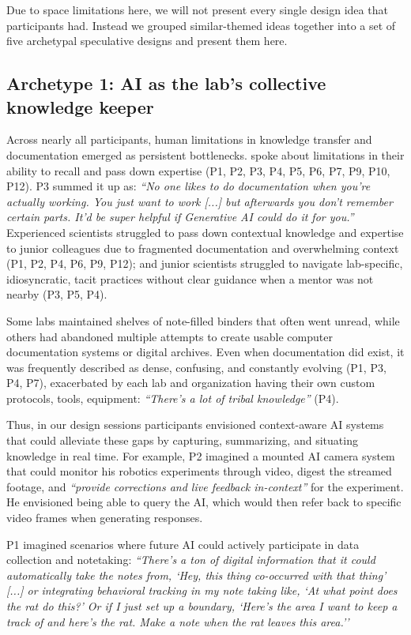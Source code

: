 Due to space limitations here, we will not present every single design idea that participants had. Instead we grouped similar-themed ideas together into a set of five archetypal speculative designs and present them here.


\subsection{\textbf{Archetype 1: AI as the lab's collective knowledge keeper}} Across nearly all participants, human limitations in knowledge transfer and documentation emerged as persistent bottlenecks.  spoke about limitations in their ability to recall and pass down expertise (P1, P2, P3, P4, P5, P6, P7, P9, P10, P12). P3 summed it up as: \textit{``No one likes to do documentation when you're actually working. You just want to work [...] but afterwards you don't remember certain parts. It'd be super helpful if Generative AI could do it for you.''} Experienced scientists struggled to pass down contextual knowledge and expertise to junior colleagues due to fragmented documentation and overwhelming context (P1, P2, P4, P6, P9, P12); and junior scientists struggled to navigate lab-specific, idiosyncratic, tacit practices without clear guidance when a mentor was not nearby (P3, P5, P4).

Some labs maintained shelves of note-filled binders that often went unread, while others had abandoned multiple attempts to create usable computer documentation systems or digital archives. Even when documentation did exist, it was frequently described as dense, confusing, and constantly evolving (P1, P3, P4, P7), exacerbated by each lab and organization having their own custom protocols, tools, equipment: \emph{``There's a lot of tribal knowledge''} (P4).

Thus, in our design sessions participants envisioned context-aware AI systems that could alleviate these gaps by capturing, summarizing, and situating knowledge in real time. For example, P2 imagined a mounted AI camera system that could monitor his robotics experiments through video, digest the streamed footage, and \textit{“provide corrections and live feedback in-context''} for the experiment. He envisioned being able to query the AI, which would then refer back to specific video frames when generating responses.

P1 imagined scenarios where future AI could actively participate in data collection and notetaking: \textit{``There's a ton of digital information that it could automatically take the notes from, `Hey, this thing co-occurred with that thing' [...] or integrating behavioral tracking in my note taking like, `At what point does the rat do this?' Or if I just set up a boundary, `Here's the area I want to keep a track of and here's the rat. Make a note when the rat leaves this area.''}

